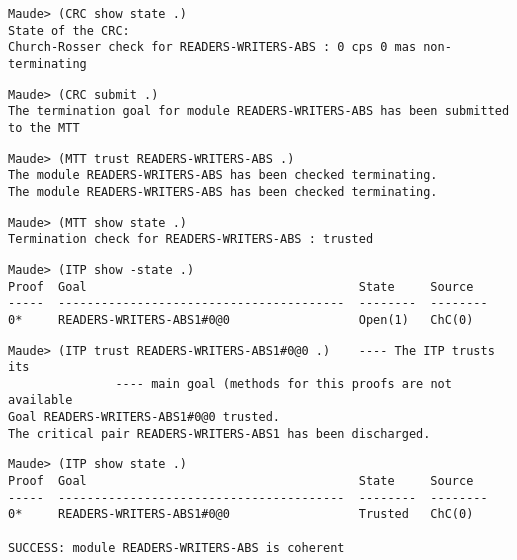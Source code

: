 \documentclass{article}
\begin{document}
\begin{lstlisting}[style=AMMA, language=Maude, numbers=none]
Maude> (CRC show state .)
State of the CRC:
Church-Rosser check for READERS-WRITERS-ABS : 0 cps 0 mas non-terminating
\end{lstlisting}

\begin{lstlisting}[style=AMMA, language=Maude, numbers=none]
Maude> (CRC submit .)
The termination goal for module READERS-WRITERS-ABS has been submitted to the MTT
\end{lstlisting}

\begin{lstlisting}[style=AMMA, language=Maude, numbers=none]
Maude> (MTT trust READERS-WRITERS-ABS .)
The module READERS-WRITERS-ABS has been checked terminating.
The module READERS-WRITERS-ABS has been checked terminating.
\end{lstlisting}

\begin{lstlisting}[style=AMMA, language=Maude, numbers=none]
Maude> (MTT show state .)
Termination check for READERS-WRITERS-ABS : trusted
\end{lstlisting}

\begin{lstlisting}[style=AMMA, language=Maude, numbers=none]
Maude> (ITP show -state .) 
Proof  Goal                                      State     Source    
-----  ----------------------------------------  --------  --------  
0*     READERS-WRITERS-ABS1#0@0                  Open(1)   ChC(0)
\end{lstlisting}

\begin{lstlisting}[style=AMMA, language=Maude, numbers=none]
Maude> (ITP trust READERS-WRITERS-ABS1#0@0 .)    ---- The ITP trusts its 
               ---- main goal (methods for this proofs are not available
Goal READERS-WRITERS-ABS1#0@0 trusted.
The critical pair READERS-WRITERS-ABS1 has been discharged.
\end{lstlisting}

\begin{lstlisting}[style=AMMA, language=Maude, numbers=none]
Maude> (ITP show state .)
Proof  Goal                                      State     Source    
-----  ----------------------------------------  --------  --------  
0*     READERS-WRITERS-ABS1#0@0                  Trusted   ChC(0)

SUCCESS: module READERS-WRITERS-ABS is coherent
\end{lstlisting}
\end{document}
